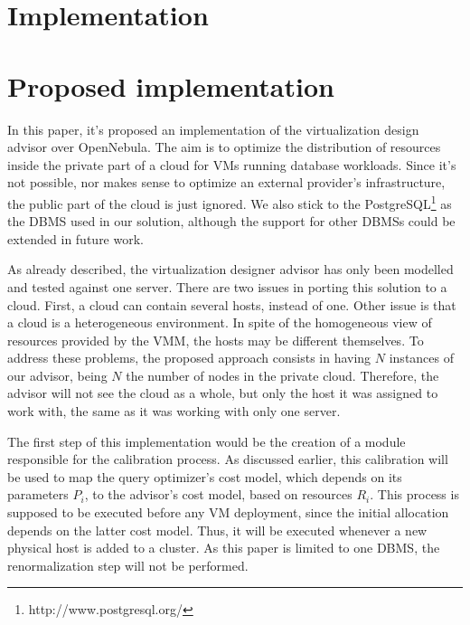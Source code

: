 \chapter{\textbf{Implementation}}



\chapter{\textbf{Proposed implementation}}

In this paper, it's proposed an implementation of the virtualization design advisor over OpenNebula. The aim is to optimize the distribution of resources inside the private part of a cloud for VMs running database workloads. Since it's not possible, nor makes sense to optimize an external provider's infrastructure, the public part of the cloud is just ignored. We also stick to the PostgreSQL\footnote{http://www.postgresql.org/} as the DBMS used in our solution, although the support for other DBMSs could be extended in future work.

As already described, the virtualization designer advisor has only been modelled and tested against one server. There are two issues in porting this solution to a cloud. First, a cloud can contain several hosts, instead of one. Other issue is that a cloud is a heterogeneous environment. In spite of the homogeneous view of resources provided by the VMM, the hosts may be different themselves. To address these problems, the proposed approach consists in having $N$ instances of our advisor, being $N$ the number of nodes in the private cloud. Therefore, the advisor will not see the cloud as a whole, but only the host it was assigned to work with, the same as it was working with only one server. 

The first step of this implementation would be the creation of a module responsible for the calibration process. As discussed earlier, this calibration will be used to map the query optimizer's cost model, which depends on its parameters $P_{i}$, to  the advisor's cost model, based on resources $R_{i}$. This process is supposed to be executed before any VM deployment, since the initial allocation depends on the latter cost model. Thus, it will be executed whenever a new physical host is added to a cluster. As this paper is limited to one DBMS, the renormalization step will  not be performed.


